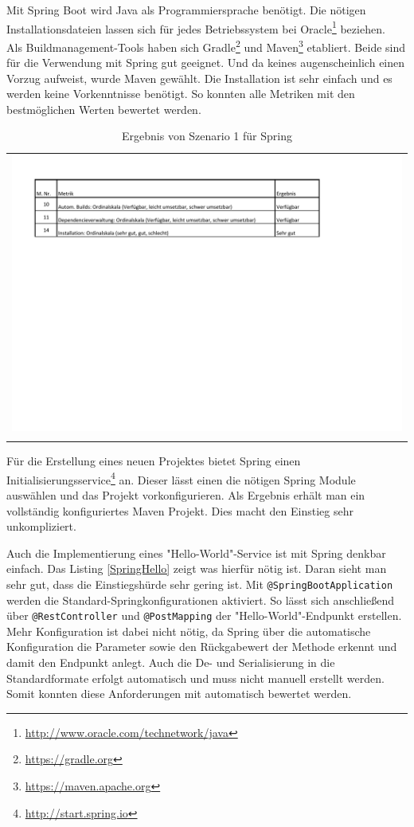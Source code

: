Mit Spring Boot wird Java als Programmiersprache benötigt. Die nötigen Installationsdateien lassen sich für jedes Betriebssystem bei Oracle\footnote{\url{http://www.oracle.com/technetwork/java}} beziehen.\\
Als Buildmanagement-Tools haben sich Gradle\footnote{\url{https://gradle.org}}  und Maven\footnote{\url{https://maven.apache.org}} etabliert. Beide sind für die Verwendung mit Spring gut geeignet. Und da keines augenscheinlich einen Vorzug aufweist, wurde Maven gewählt. Die Installation ist sehr einfach und es werden keine Vorkenntnisse benötigt. So konnten alle Metriken mit den bestmöglichen Werten bewertet werden.

\begin{longtable}{c}
	\includegraphics[width=\linewidth]{Bilder/Sz1ErgebnisSpring.pdf} \\	
	\caption[Szenario 1 Ergebnis Spring]{Ergebnis von Szenario 1 für Spring}
	\label{Sz1ErgebnisSpring}\\
\end{longtable}
\FloatBarrier

Für die Erstellung eines neuen Projektes bietet Spring einen Initialisierungsservice\footnote{\url{http://start.spring.io}} an. Dieser lässt einen die nötigen Spring Module auswählen und das Projekt vorkonfigurieren. Als Ergebnis erhält man ein vollständig konfiguriertes Maven Projekt.
Dies macht den Einstieg sehr unkompliziert.

Auch die Implementierung eines "Hello-World"-Service ist mit Spring denkbar einfach. Das Listing \ref{SpringHello} zeigt was hierfür nötig ist. Daran sieht man sehr gut, dass die Einstiegshürde sehr gering ist. 
Mit \lstinline|@SpringBootApplication| werden die Standard-Spring\-konfigurationen aktiviert. So lässt sich anschließend über \lstinline|@RestController| und \lstinline|@PostMapping| der "Hello-World"-Endpunkt erstellen.
Mehr Konfiguration ist dabei nicht nötig, da Spring über die automatische Konfiguration die Parameter sowie den Rückgabewert der Methode erkennt und damit den Endpunkt anlegt. Auch die De- und Serialisierung in die Standardformate erfolgt automatisch und muss nicht manuell erstellt werden. Somit konnten diese Anforderungen mit automatisch bewertet werden. 

